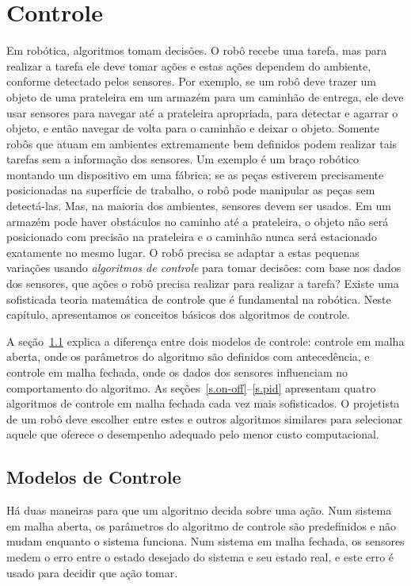 
\chapter{Controle}\label{ch.control}

Em robótica, algoritmos tomam decisões. O robô recebe uma tarefa, mas para realizar a tarefa ele deve tomar ações e estas ações dependem do ambiente, conforme detectado pelos sensores. Por exemplo, se um robô deve trazer um objeto de uma prateleira em um armazém para um caminhão de entrega, ele deve usar sensores para navegar até a prateleira apropriada, para detectar e agarrar o objeto, e então navegar de volta para o caminhão e deixar o objeto. Somente robôs que atuam em ambientes extremamente bem definidos podem realizar tais tarefas sem a informação dos sensores. Um exemplo é um braço robótico montando um dispositivo em uma fábrica; se as peças estiverem precisamente posicionadas na superfície de trabalho, o robô pode manipular as peças sem detectá-las. Mas, na maioria dos ambientes, sensores devem ser usados. Em um armazém pode haver obstáculos no caminho até a prateleira, o objeto não será posicionado com precisão na prateleira e o caminhão nunca será estacionado exatamente no mesmo lugar. O robô precisa se adaptar a estas pequenas variações usando \emph{algoritmos de controle} para tomar decisões: com base nos dados dos sensores, que ações o robô precisa realizar para realizar a tarefa? Existe uma sofisticada teoria matemática de controle que é fundamental na robótica. Neste capítulo, apresentamos os conceitos básicos dos algoritmos de controle.

A seção~\ref{s.control-model} explica a diferença entre dois modelos de controle: controle em malha aberta, onde os parâmetros do algoritmo são definidos com antecedência, e controle em malha fechada, onde os dados dos sensores influenciam no comportamento do algoritmo. As seções~\ref{s.on-off}--\ref{s.pid} apresentam quatro algoritmos de controle em malha fechada cada vez mais sofisticados. O projetista de um robô deve escolher entre estes e outros algoritmos similares para selecionar aquele que oferece o desempenho adequado pelo menor custo computacional.

\section{Modelos de Controle}\label{s.control-model}

Há duas maneiras para que um algoritmo decida sobre uma ação. Num sistema em malha aberta, os parâmetros do algoritmo de controle são predefinidos e não mudam enquanto o sistema funciona. Num sistema em malha fechada, os sensores medem o erro entre o estado desejado do sistema e seu estado real, e este erro é usado para decidir que ação tomar.


